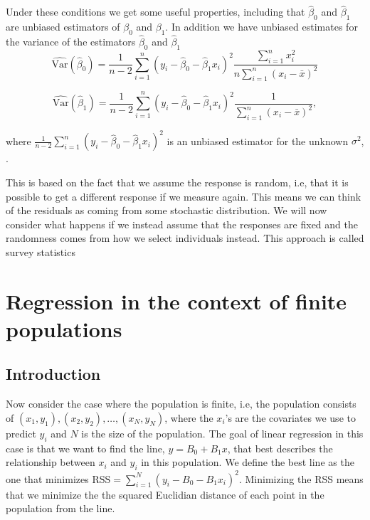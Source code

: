 \documentclass{article}
\begin{document}
Under these conditions we get some useful properties, including that \(\hat{\beta}_0\) and \(\hat{\beta}_1\) are unbiased estimators of
\(\beta_0\) and \(\beta_1\). In addition we have
unbiased estimates for the
variance of the estimators \(\hat{\beta}_0\) and \(\hat{\beta}_1\)
\begin{equation*}
 \widehat{\mathrm{Var}} \left( \hat{\beta}_0 \right) = \frac{1}{n - 2} \sum_{i = 1}^n\left( y_i - \hat{\beta}_0 -
 \hat{\beta}_1 x_i \right)^2 \frac{\sum_{i = 1}^n x_i^2}{n
   \sum_{i = 1}^n \left( x_i - \bar{x} \right)^2}
\end{equation*}
 

\begin{equation*}
 \widehat{\mathrm{Var}} \left( \hat{\beta}_1 \right) = \frac{1}{n - 2} \sum_{i = 1}^n\left( y_i - \hat{\beta}_0 -
 \hat{\beta}_1 x_i \right)^2\frac{1}{
   \sum_{i = 1}^n \left( x_i - \bar{x} \right)^2},
\end{equation*}

where \(\frac{1}{n - 2} \sum_{i = 1}^n\left( y_i - \hat{\beta}_0 -
 \hat{\beta}_1 x_i \right)^2\) is an
unbiased estimator for the unknown \(\sigma^2\), \cite[Chapter 11]{st1101}.

This is based on the fact that we assume the response is random, i.e, that
it is possible to get a different response if we measure again. This means we
can think of the residuals as coming from some stochastic distribution. We will
now consider what happens if we instead assume that the responses are fixed and the
randomness comes from how we select individuals instead.
This approach is called survey statistics


\section{Regression in the context of finite populations} \label{sec:RegFinPop}

\subsection{Introduction}

Now consider the case where the population is finite, i.e, the population
consists of \((x_1, y_1),
(x_2, y_2), \dots , (x_N, y_N)\), where the \(x_i\)'s are the covariates we use to
predict \(y_i\) and \(N\) is the size of the population.
The goal of linear regression in this case is that we want to find the
line, \(y = B_0 + B_1x\), that best describes the relationship between \(x_i\)
and \(y_i\) in this population. We define the best line as the one
that minimizes \(\mathrm{RSS} = \sum_{i = 1}^N (y_i - B_0 - B_1 x_i)^2\).
Minimizing the RSS means that we minimize the the squared Euclidian distance of each point
in the population from the line.
\end{document}
